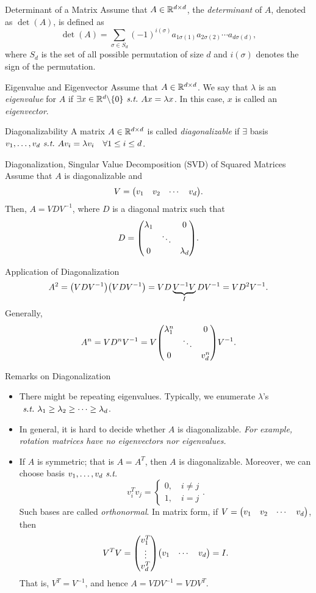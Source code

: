 \begin{df}{Determinant of a Matrix}
	Assume that $A\in{\mathbb{R}}^{d\times d}$, the \textit{determinant} of $A$, denoted as $\det(A)$, is defined as \[\det(A)=\sum_{\sigma\in S_d}(-1)^{i(\sigma)}a_{1\sigma(1)}a_{2\sigma(2)}\cdots a_{d\sigma(d)},\] where $S_d$ is the set of all possible permutation of size $d$ and $i(\sigma)$ denotes the sign of the permutation. 
\end{df}
\begin{df}{Eigenvalue and Eigenvector}
	Assume that	$A\in{\mathbb{R}}^{d\times d}$. We say that $\lambda$ is an \textit{eigenvalue} for $A$ if $\exists x\in{\mathbb{R}}^d\backslash\qty{0}\emph{\ s.t.\ } Ax=\lambda x$. In this case, $x$ is called an \textit{eigenvector}.
\end{df}
\begin{df}{Diagonalizability}
	A matrix $A\in{\mathbb{R}}^{d\times d}$ is called \textit{diagonalizable} if $\exists$ basis $v_1,\dots,v_d\emph{\ s.t.\ } Av_i=\lambda v_i\quad\forall1\leq i\leq d$. 
\end{df}
\begin{thm}{Diagonalization, Singular Value Decomposition (SVD) of Squared Matrices}
	Assume that $A$ is diagonalizable and \[V=\mqty(v_1&v_2&\cdots&v_d).\] Then, $A=VDV^{-1}$, where $D$ is a diagonal matrix such that \[D=\mqty(\lambda_1&&0\\&\ddots&\\0&&\lambda_d).\]
\end{thm}
\begin{eg}{Application of Diagonalization}
	\[A^2=\qty(VDV^{-1})\qty(VDV^{-1})=VD\underbrace{V^{-1}V}_IDV^{-1}=VD^2V^{-1}.\] Generally, \[A^n=VD^nV^{-1}=V\mqty(\lambda_1^n&&0\\&\ddots&\\0&&v_d^n)V^{-1}.\]
\end{eg}
\begin{rmk} Remarks on Diagonalization
	\begin{itemize}
		\item There might be repeating eigenvalues. Typically, we enumerate $\lambda$'s $\emph{\ s.t.\ }\lambda_1\geq\lambda_2\geq\cdots\geq\lambda_d$.
		\item In general, it is hard to decide whether $A$ is diagonalizable. \emph{For example, rotation matrices have no eigenvectors nor eigenvalues.}
		\item If $A$ is symmetric; that is $A=A^T$, then $A$ is diagonalizable. Moreover, we can choose basis $v_1,\dots,v_d \emph{\ s.t.\ }$ \[v_i^Tv_j=\begin{cases}0,\quad i\neq j\\1,\quad i=j\end{cases}.\] Such bases are called \emph{orthonormal}. In matrix form, if $V=\mqty(v_1&v_2&\cdots&v_d)$, then \[V^TV=\mqty(v_1^T\\\vdots\\v_d^T)\mqty(v_1&\cdots&v_d)=I.\] That is, $V^T=V^{-1}$, and hence $A=VDV^{-1}=VDV^{T}$.
	\end{itemize}	
\end{rmk}



